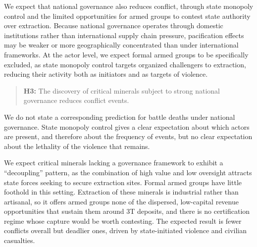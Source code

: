 \documentclass[11pt]{article}
\begin{document}
We expect that national governance also reduces conflict, through state monopoly control and the limited opportunities for armed groups to contest state authority over extraction. Because national governance operates through domestic institutions rather than international supply chain pressure, pacification effects may be weaker or more geographically concentrated than under international frameworks. At the actor level, we expect formal armed groups to be specifically excluded, as state monopoly control targets organized challengers to extraction, reducing their activity both as initiators and as targets of violence.

\begin{quote}
\textbf{H3:} The discovery of critical minerals subject to strong national governance reduces conflict events.
\end{quote}

We do not state a corresponding prediction for battle deaths under national governance. State monopoly control gives a clear expectation about which actors are present, and therefore about the frequency of events, but no clear expectation about the lethality of the violence that remains.

We expect critical minerals lacking a governance framework to exhibit a ``decoupling'' pattern, as the combination of high value and low oversight attracts state forces seeking to secure extraction sites. Formal armed groups have little foothold in this setting. Extraction of these minerals is industrial rather than artisanal, so it offers armed groups none of the dispersed, low-capital revenue opportunities that sustain them around 3T deposits, and there is no certification regime whose capture would be worth contesting. The expected result is fewer conflicts overall but deadlier ones, driven by state-initiated violence and civilian casualties.
\end{document}
